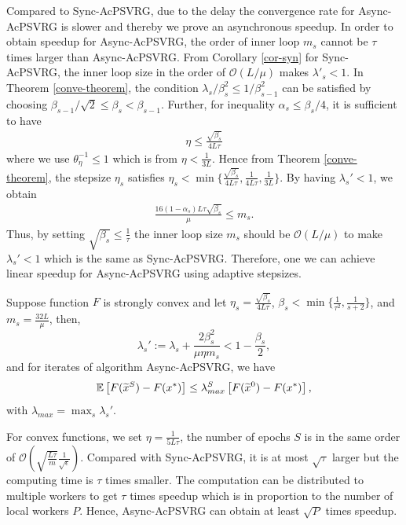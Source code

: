 \begin{remark}
Compared to Sync-AcPSVRG, due to the delay the convergence rate for Async-AcPSVRG is slower and thereby we prove an asynchronous speedup. In order to obtain speedup for Async-AcPSVRG, the order of inner loop $m_s$ cannot be $\tau$ times larger than Async-AcPSVRG. From Corollary \ref{cor-syn} for Sync-AcPSVRG, the inner loop size in the order of $\mathcal{O}(L/\mu)$ makes $\lambda'_s<1$. In Theorem \ref{conve-theorem}, the condition $\lambda_s/\beta_s^2 \leq 1/\beta_{s-1}^2$ can be satisfied by choosing $\beta_{s-1}/\sqrt{2}\leq \beta_s < \beta_{s-1}$. Further, for inequality $\alpha_s\leq \beta_s/4$, it is sufficient to have 
\begin{equation}
\begin{split}
\eta \leq \frac{\sqrt{\beta_s}}{4L\tau}
\end{split}
\end{equation}
where we use  $\theta_\eta^{-1} \leq 1$ which is from $\eta< \frac{1}{3L}$.
Hence from Theorem \ref{conve-theorem}, the stepsize $\eta_s$ satisfies $\eta_s<\min\{\frac{\sqrt{\beta_s}}{4L\tau},\frac{1}{4L
\tau}, \frac{1}{3L}\}$. By having $\lambda_s'<1$, we obtain 
\begin{equation}
\begin{split}
\frac{16(1-\alpha_s)L\tau\sqrt{\beta_s}}{\mu} \leq m_s.
\end{split}
\end{equation}
Thus, by setting $\sqrt{\beta_s}\leq \frac{1}{\tau}$ the inner loop size $m_s$ should be $\mathcal{O}(L/\mu)$ to make $\lambda_s'<1$ which is the same as Sync-AcPSVRG. Therefore, one we can achieve linear speedup for Async-AcPSVRG using adaptive stepsizes.
\end{remark}
\begin{corollary}\label{cor-asyn}
Suppose function $F$ is strongly convex and 
let $\eta_s=\frac{\sqrt{\beta_s}}{4L\tau}$, $\beta_s< \min\{\frac{1}{\tau^2},\frac{1}{s+2}\}$, and $m_s=\frac{32L}{\mu}$, then, 
\[
\lambda_s' := \lambda_s+{\frac{2 \beta_s^2}{\mu\eta m_s}} < 1-\frac{\beta_s}{2},
\]
and for iterates of algorithm Async-AcPSVRG, we have
\begin{equation}
\mathbb{E}\left[F(\widetilde{x}^S)-F(x^*)\right]\leq \lambda_{max}^S\left[F(\widetilde{x}^0)-F(x^*)\right], 
\end{equation}
with $\lambda_{max} = \max_{s}{\lambda_s'}$. 
\end{corollary}
\begin{remark}
For convex functions, we set $\eta=\frac{1}{5L\tau}$, the number of epochs $S$ is in the same order of $\mathcal{O}(\sqrt{\frac{L\tau}{m}}\frac{1}{\sqrt{\epsilon}})$.
Compared with Sync-AcPSVRG, it
is at most $\sqrt{\tau}$ larger but the computing time is $\tau$ times smaller.
The computation can be distributed to multiple
workers to get $\tau$ times speedup which is in proportion to the number of local workers $P$. Hence, Async-AcPSVRG can
obtain at least $\sqrt{P}$ times speedup.
\end{remark}
